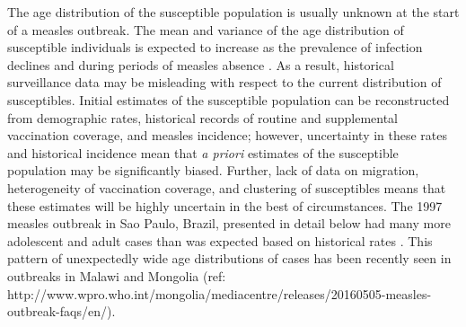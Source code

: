 The age distribution of the susceptible population is usually unknown at the start of a measles outbreak. The mean and variance of the age distribution of susceptible individuals is expected to increase as the prevalence of infection declines \cite{Goodson_2011, Ferrari_2013} and during periods of measles absence \cite{Durrheim_2014}. As a result, historical surveillance data may be misleading with respect to the current distribution of susceptibles. Initial estimates of the susceptible population can be reconstructed from demographic rates, historical records of routine and supplemental vaccination coverage, and measles incidence\cite{Takahashi_2015}; however, uncertainty in these rates and historical incidence mean that \emph{a priori} estimates of the susceptible population may be significantly biased. Further, lack of data on migration, heterogeneity of vaccination coverage, and clustering of susceptibles means that these estimates will be highly uncertain in the best of circumstances. The 1997 measles outbreak in Sao Paulo, Brazil, presented in detail below had many more adolescent and adult cases than was expected based on historical rates \cite{Camargo_2000}. This pattern of unexpectedly wide age distributions of cases has been recently seen in outbreaks in Malawi \cite{Minetti_2013} and Mongolia (ref: http://www.wpro.who.int/mongolia/mediacentre/releases/20160505-measles-outbreak-faqs/en/).

